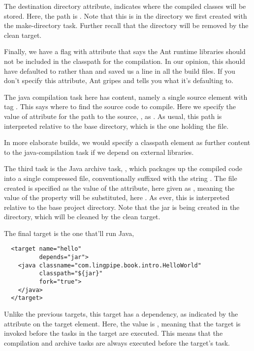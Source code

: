 The destination directory attribute,  indicates where
the compiled classes will be stored.  Here, the path is .
Note that this is in the directory we first created with the
make-directory task.  Further recall that the  directory
will be removed by the clean target.

Finally, we have a flag with attribute  that
says the Ant runtime libraries should not be included in the classpath
for the compilation.  In our opinion, this should have defaulted to
 rather than  and saved us a line in all the
build files.  If you don't specify this attribute, Ant gripes and
tells you what it's defaulting to.

The java compilation task here has content, namely a single
source element with tag .  This says where to find
the source code to compile.  Here we specify the value of
attribute for the path to the source, , as
.  As usual, this path is interpreted relative to the base directory,
which is the one holding the  file.  

In more elaborate builds, we would specify a classpath element as
further content to the java-compilation task if we depend on external
libraries.  

The third task is the Java archive task, , which packages up
the compiled code into a single compressed file, conventionally
suffixed with the string .  The file created is specified
as the value of the  attribute, here given as
, meaning the value of the  property will be
substituted, here .  As ever, this is
interpreted relative to the base project directory.  Note that the jar
is being created in the  directory, which will be cleaned
by the clean target.  

The final target is the one that'll run Java,

\begin{verbatim}
  <target name="hello"
          depends="jar">
    <java classname="com.lingpipe.book.intro.HelloWorld"
          classpath="${jar}"
          fork="true">
    </java>
  </target>
\end{verbatim}
%
Unlike the previous targets, this target has a dependency, as
indicated by the  attribute on the target element.
Here, the value is , meaning that the  target is
invoked before the tasks in the  target are executed.
This means that the compilation and archive tasks are always executed
before the  target's task.  

